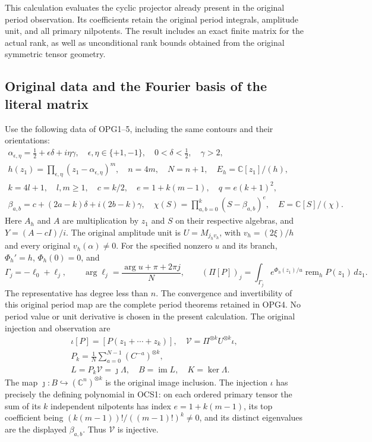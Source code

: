 \documentclass[11pt,a4paper]{article}
\begin{document}
This calculation evaluates the cyclic projector already present in
the original period observation. Its coefficients retain the original
period integrals, amplitude unit, and all primary nilpotents. The
result includes an exact finite matrix for the actual rank, as well
as unconditional rank bounds obtained from the original symmetric
tensor geometry.

\subsection{Original data and the Fourier basis of the literal matrix}
Use the following data of OPG1--5, including the same contours and
their orientations:
\[
 \begin{gathered}
 \alpha_{\epsilon,\eta}=\tfrac12+\epsilon\delta+i\eta\gamma,
 \quad\epsilon,\eta\in\{+1,-1\},\quad0<\delta<\tfrac12,\quad\gamma>2,\\
 h(z_1)=\prod_{\epsilon,\eta}(z_1-\alpha_{\epsilon,\eta})^m,
 \quad n=4m,\quad N=n+1,\quad E_h=\mathbb C[z_1]/(h),\\
 k=4l+1,\quad l,m\geq1,\quad c=k/2,
 \quad e=1+k(m-1),\quad q=e(k+1)^2,\\
 \beta_{a,b}=c+(2a-k)\delta+i(2b-k)\gamma,
 \quad\chi(S)=\prod_{a,b=0}^k(S-\beta_{a,b})^e,
 \quad E=\mathbb C[S]/(\chi).
 \end{gathered}\tag{OCS1}
\]
Here $A_h$ and $A$ are multiplication by $z_1$ and $S$ on their
respective algebras, and $Y=(A-cI)/i$. The original amplitude
unit is $U=M_{j_hv_h}$, with $v_h=(2\xi)/h$ and every original
$v_h(\alpha)\ne0$. For the specified nonzero $u$ and its branch,
$\Phi_h'=h$, $\Phi_h(0)=0$, and
\[
 \Gamma_j=-\ell_0+\ell_j,\qquad
 \arg\ell_j=\frac{\arg u+\pi+2\pi j}{N},\qquad
 (\Pi[P])_j=\int_{\Gamma_j}e^{\Phi_h(z_1)/u}
                       \operatorname{rem}_hP(z_1)\,dz_1.
 \tag{OCS2}
\]
The representative has degree less than $n$. The convergence and
invertibility of this original period map are the complete period
theorems retained in OPG4. No period value or unit derivative is
chosen in the present calculation. The original injection and
observation are
\[
\begin{gathered}
 \iota[P]=[P(z_1+\cdots+z_k)],\quad
 \mathcal V=\Pi^{\otimes k}U^{\otimes k}\iota,
 \\ P_k=\frac1N\sum_{a=0}^{N-1}(C^{-a})^{\otimes k},
 \\ L=P_k\mathcal V=\jmath\Lambda,
 \quad B=\operatorname{im}L,\quad K=\ker\Lambda.
\end{gathered}\tag{OCS3}
\]
The map $\jmath:B\hookrightarrow(\mathbb C^n)^{\otimes k}$
is the original image inclusion. The injection $\iota$ has precisely
the defining polynomial in OCS1: on each ordered primary tensor
the sum of its $k$ independent nilpotents has index
$e=1+k(m-1)$, its top coefficient being
$(k(m-1))!/((m-1)!)^k\ne0$, and its distinct eigenvalues are
the displayed $\beta_{a,b}$. Thus $\mathcal V$ is injective.
\end{document}
